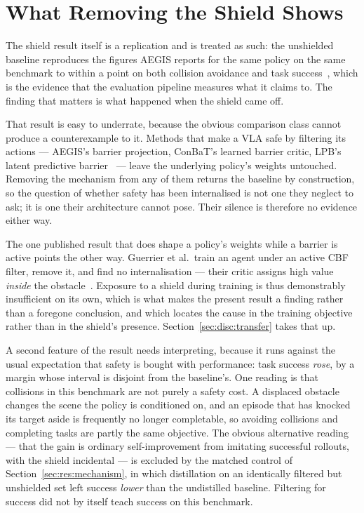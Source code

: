 \section{What Removing the Shield Shows}\label{sec:disc:removal}

The shield result itself is a replication and is treated as such: the unshielded baseline reproduces
the figures AEGIS reports for the same policy on the same benchmark to within a point on both
collision avoidance and task success~\cite{vlsa2026}, which is the evidence that the evaluation
pipeline measures what it claims to. The finding that matters is what happened when the shield came
off.

That result is easy to underrate, because the obvious comparison class cannot produce a
counterexample to it. Methods that make a VLA safe by filtering its actions --- AEGIS's barrier
projection, ConBaT's learned barrier critic, LPB's latent predictive
barrier~\cite{vlsa2026,meng2024conbat,sun2025lpb} --- leave the underlying policy's weights
untouched. Removing the mechanism from any of them returns the baseline by construction, so the
question of whether safety has been internalised is not one they neglect to ask; it is one their
architecture cannot pose. Their silence is therefore no evidence either way.

The one published result that does shape a policy's weights while a barrier is active points the
other way. Guerrier et al.\ train an agent under an active CBF filter, remove it, and find no
internalisation --- their critic assigns high value \emph{inside} the
obstacle~\cite{guerrier2025guardrails}. Exposure to a shield during training is thus demonstrably
insufficient on its own, which is what makes the present result a finding rather than a foregone
conclusion, and which locates the cause in the training objective rather than in the shield's
presence. Section~\ref{sec:disc:transfer} takes that up.

A second feature of the result needs interpreting, because it runs against the usual expectation
that safety is bought with performance: task success \emph{rose}, by a margin whose interval is
disjoint from the baseline's. One reading is that collisions in this benchmark are not purely a
safety cost. A displaced obstacle changes the scene the policy is conditioned on, and an episode
that has knocked its target aside is frequently no longer completable, so avoiding collisions and
completing tasks are partly the same objective. The obvious alternative reading --- that the gain
is ordinary self-improvement from imitating successful rollouts, with the shield incidental --- is
excluded by the matched control of Section~\ref{sec:res:mechanism}, in which distillation on an
identically filtered but unshielded set left success \emph{lower} than the undistilled baseline.
Filtering for success did not by itself teach success on this benchmark.

